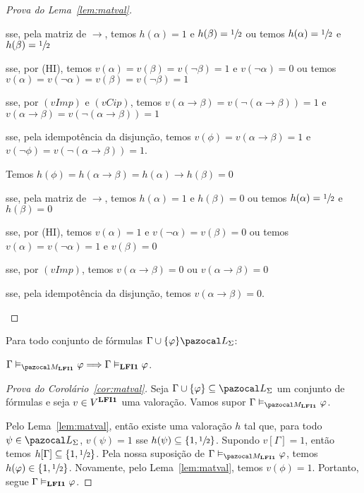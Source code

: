 \begin{proof}[Prova do Lema~\ref{lem:matval}]
\begin{provaporcasos}
\begin{provaporsubcasos}
                    \qquad{}sse, pela matriz de $\to$, temos $h(\alpha) = 1$ e $h(\beta) = \sfrac{1}{2}{}$ ou temos $h(\alpha) = \sfrac{1}{2}{}$ e $h(\beta) = \sfrac{1}{2}{}$

                    \qquad{}sse, por (HI), temos $v(\alpha) = v(\beta) = v(\neg \beta) = 1$ e $v(\neg \alpha) = 0$ ou temos $v(\alpha) = v(\neg \alpha) = v(\beta) = v(\neg \beta) = 1$

                    \qquad{}sse, por $(vImp)$ e $(vCip)$, temos $v(\alpha \to \beta) = v(\neg (\alpha \to \beta)) = 1$ e $v(\alpha \to \beta) = v(\neg (\alpha \to \beta)) = 1$

                    \qquad{}sse, pela idempotência da disjunção, temos $v(\phi) = v(\alpha \to \beta) = 1$ e $v(\neg \phi) = v(\neg (\alpha \to \beta)) = 1$.


                    Temos $h(\phi) = h(\alpha \to \beta) = h(\alpha) \to h(\beta) = 0$

                    \qquad{}sse, pela matriz de $\to$, temos $h(\alpha) = 1$ e $h(\beta) = 0$ ou temos $h(\alpha) = \sfrac{1}{2}{}$ e $h(\beta) = 0$

                    \qquad{}sse, por (HI), temos $v(\alpha) = 1$ e $v(\neg \alpha) = v(\beta) = 0$ ou temos $v(\alpha) = v(\neg \alpha) = 1$ e $v(\beta) = 0$

                    \qquad{}sse, por $(vImp)$, temos $v(\alpha \to \beta) = 0$ ou $v(\alpha \to \beta) = 0$

                    \qquad{}sse, pela idempotência da disjunção, temos $v(\alpha \to \beta) = 0$.
            \end{provaporsubcasos}
        \end{provaporcasos}
    \end{proof}

    \begin{corolario}\label{cor:matval}
        Para todo conjunto de fórmulas $\Gamma \cup \{\phi\} \ling{}$:

        \centering
        $\Gamma \conmat \phi \Longrightarrow \Gamma \conval \phi$. 
    \end{corolario}

    \begin{proof}[Prova do Corolário~\ref{cor:matval}]
        Seja $\Gamma \cup \{\phi\} \subseteq \ling{}$ um conjunto de fórmulas e seja $v \in V^{{\normalfont\textbf{LFI1}}{}}$ uma valoração. Vamos supor $\Gamma \conmat \phi$.

        Pelo Lema~\ref{lem:matval}, então existe uma valoração $h$ tal que, para todo $\psi \in \ling{}$, $v(\psi) = 1$ sse $h(\psi) \subseteq \{1, \sfrac{1}{2}{}\}$. Supondo $v[\Gamma] = 1$, então temos $h[\Gamma] \subseteq \{1,\sfrac{1}{2}{}\}{}$. Pela nossa suposição de $\Gamma \conmat \phi$, temos $h(\varphi) \in \{1, \sfrac{1}{2}{}\}$. Novamente, pelo Lema~\ref{lem:matval}, temos $v(\phi) = 1$. Portanto, segue $\Gamma \vDash_{{\normalfont\textbf{LFI1}}{}} \varphi$.

    \end{proof}

